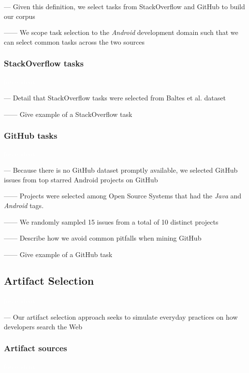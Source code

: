 \vspace{3mm}

--- Given this definition, we select tasks from StackOverflow and GitHub to build our corpus

------ We scope task selection to the \textit{Android} development domain such that we can select common tasks across the two sources \vspace{3mm}


\subsubsection{StackOverflow tasks}
\textcolor{white}{force ident} %

--- Detail that StackOverflow tasks were selected from Baltes et al. dataset~\cite{baltes2019-rep}

------ Give example of a StackOverflow task \vspace{5mm}

\subsubsection{GitHub tasks}
\textcolor{white}{force ident} %

--- Because there is no GitHub dataset promptly available, we selected GitHub issues from top starred Android projects on GitHub 

------ Projects were selected among Open Source Systems that had the \textit{Java} and \textit{Android} tags. 

------ We randomly sampled 15 issues from a total of 10 distinct projects

------ Describe how we avoid common pitfalls  when mining GitHub~\cite{kalliamvakou2014}

------ Give example of a GitHub task 

\subsection{Artifact Selection}
\label{cp4:corpus-artifacts}
\textcolor{white}{force ident} %


--- Our artifact selection approach seeks to simulate everyday practices on how developers search the Web~\cite{rao2020, Xia2017} \vspace{3mm}


\subsubsection{Artifact sources}
\textcolor{white}{force ident} %

